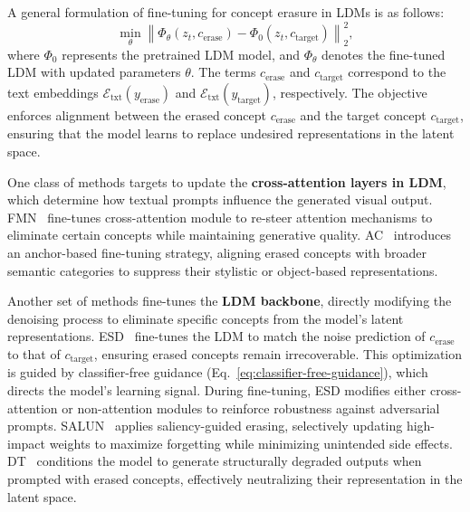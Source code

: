 A general formulation of fine-tuning for concept erasure in LDMs is as follows: \begin{equation}
    \min_{\theta} \left\| \Phi_{\theta}(z_t, c_{\text{erase}}) - \Phi_{0}(z_t, c_{\text{target}}) \right\|^{2}_2,
\end{equation}
where \( \Phi_{0} \) represents the pretrained LDM model, and \( \Phi_{\theta} \) denotes the fine-tuned LDM with updated parameters \( \theta \). The terms \( c_{\text{erase}} \) and \( c_{\text{target}} \) correspond to the text embeddings \( \mathcal{E}_{\text{txt}}(y_{\text{erase}}) \) and \( \mathcal{E}_{\text{txt}}(y_{\text{target}}) \), respectively. The objective enforces alignment between the erased concept \( c_{\text{erase}} \) and the target concept \( c_{\text{target}} \), ensuring that the model learns to replace undesired representations in the latent space.

One class of methods targets to update the \textbf{cross-attention layers in LDM}, which determine how textual prompts influence the generated visual output. FMN~\cite{Zhang2023ForgetMeNotLT} fine-tunes cross-attention module to re-steer attention mechanisms to eliminate certain concepts while maintaining generative quality. 
 AC~\cite{Ablating_Concept} introduces an anchor-based fine-tuning strategy, aligning erased concepts with broader semantic categories to suppress their stylistic or object-based representations.

Another set of methods fine-tunes the \textbf{LDM backbone}, directly modifying the denoising process to eliminate specific concepts from the model’s latent representations. 
ESD~\cite{esd} fine-tunes the LDM to match the noise prediction of \( c_{\text{erase}} \) to that of \( c_{\text{target}} \), ensuring erased concepts remain irrecoverable. This optimization is guided by classifier-free guidance (Eq.~\eqref{eq:classifier-free-guidance}), which directs the model's learning signal. During fine-tuning, ESD modifies either cross-attention or non-attention modules to reinforce robustness against adversarial prompts.
SALUN~\cite{fan2024salun} applies saliency-guided erasing, selectively updating high-impact weights to maximize forgetting while minimizing unintended side effects. 
DT~\cite{Ni2023DegenerationTuningUS} conditions the model to generate structurally degraded outputs when prompted with erased concepts, effectively neutralizing their representation in the latent space.

